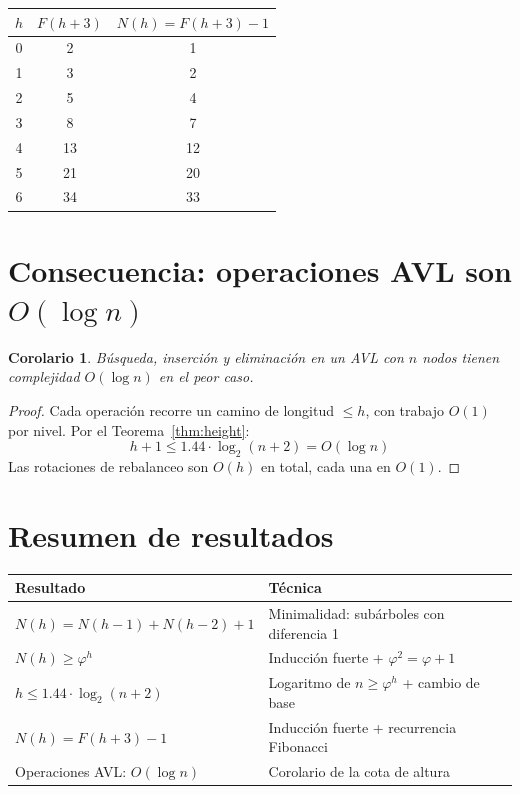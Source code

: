 \documentclass[11pt, letterpaper]{article}
\theoremstyle{definition}
\theoremstyle{plain}
\newtheorem{corollary}[theorem]{Corolario}
\theoremstyle{remark}
\begin{document}
\begin{table}[h]
\centering
\begin{tabular}{ccc}
\toprule
$h$ & $F(h{+}3)$ & $N(h) = F(h{+}3) - 1$ \\
\midrule
0 & 2 & 1 \\
1 & 3 & 2 \\
2 & 5 & 4 \\
3 & 8 & 7 \\
4 & 13 & 12 \\
5 & 21 & 20 \\
6 & 34 & 33 \\
\bottomrule
\end{tabular}
\end{table}

\section{Consecuencia: operaciones AVL son \texorpdfstring{$O(\log n)$}{O(log n)}}

\begin{corollary}
Búsqueda, inserción y eliminación en un AVL con $n$ nodos tienen
complejidad $O(\log n)$ en el peor caso.
\end{corollary}

\begin{proof}
Cada operación recorre un camino de longitud $\leq h$, con trabajo
$O(1)$ por nivel. Por el Teorema~\ref{thm:height}:
\[
  h + 1 \leq 1.44 \cdot \log_2(n{+}2) = O(\log n)
\]
Las rotaciones de rebalanceo son $O(h)$ en total, cada una en $O(1)$.
\end{proof}

\section{Resumen de resultados}

\begin{table}[h]
\centering
\begin{tabular}{ll}
\toprule
\textbf{Resultado} & \textbf{Técnica} \\
\midrule
$N(h) = N(h{-}1) + N(h{-}2) + 1$
  & Minimalidad: subárboles con diferencia 1 \\
$N(h) \geq \varphi^h$
  & Inducción fuerte + $\varphi^2 = \varphi + 1$ \\
$h \leq 1.44 \cdot \log_2(n{+}2)$
  & Logaritmo de $n \geq \varphi^h$ + cambio de base \\
$N(h) = F(h{+}3) - 1$
  & Inducción fuerte + recurrencia Fibonacci \\
Operaciones AVL: $O(\log n)$
  & Corolario de la cota de altura \\
\bottomrule
\end{tabular}
\end{table}
\end{document}
